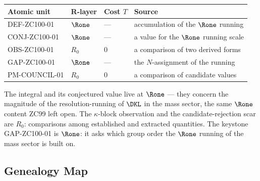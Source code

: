 \documentclass[12pt, a4paper]{article}
\begin{document}
\begin{layerbox}[title={R-Layer Assignments for ZC100}]
{\small\renewcommand{\arraystretch}{1.25}
\begin{center}
\begin{tabular}{@{}llll@{}}
\toprule
Atomic unit & R-layer & Cost $T$ & Source \\
\midrule
DEF-ZC100-01   & $\Rone$ & --- & accumulation of the $\Rone$ running \\
CONJ-ZC100-01  & $\Rone$ & --- & a value for the $\Rone$ running scale \\
OBS-ZC100-01   & $R_0$ & $0$ & a comparison of two derived forms \\
GAP-ZC100-01   & $\Rone$ & --- & the $N$-assignment of the running \\
PM-COUNCIL-01  & $R_0$ & $0$ & a comparison of candidate values \\
\bottomrule
\end{tabular}
\end{center}}
The integral and its conjectured value live at $\Rone$ --- they concern the
magnitude of the resolution-running of $\DKL$ in the mass sector, the same
$\Rone$ content ZC99 left open. The $\kappa$-block observation and the
candidate-rejection scar are $R_0$: comparisons among established and extracted
quantities. The keystone GAP-ZC100-01 is $\Rone$: it asks which group order the
$\Rone$ running of the mass sector is built on.
\end{layerbox}

\subsection{Genealogy Map}
\label{sec:genealogy-zc100}
\end{document}
